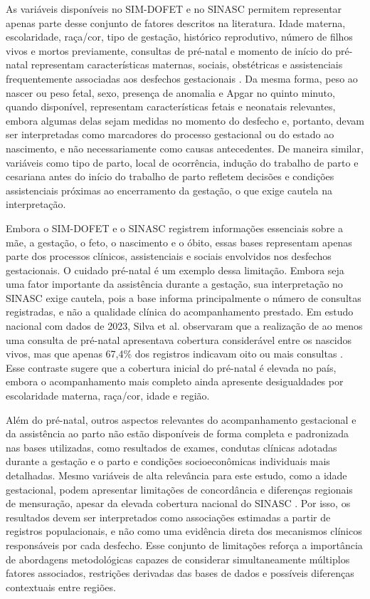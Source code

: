 As variáveis disponíveis no SIM-DOFET e no SINASC permitem representar apenas parte
desse conjunto de fatores descritos na literatura. Idade materna, escolaridade, 
raça/cor, tipo de gestação, histórico reprodutivo, número de filhos vivos 
e mortos previamente, consultas de pré-natal e momento de início do pré-natal 
representam características maternas, sociais, obstétricas e assistenciais frequentemente 
associadas aos desfechos gestacionais \cite{Victor2025PretermBrazil,Marques2026FetRiskS,
ACOG2020Stillbirth,Silva2026PrenatalInequities}. Da mesma forma, peso ao nascer ou 
peso fetal, sexo, presença de anomalia e Apgar no quinto minuto, quando disponível, 
representam características fetais e neonatais relevantes, embora algumas delas 
sejam medidas no momento do desfecho e, portanto, devam ser interpretadas como 
marcadores do processo gestacional ou do estado ao nascimento, e não necessariamente 
como causas antecedentes. De maneira similar, variáveis como tipo de parto, local 
de ocorrência, indução do trabalho de parto e cesariana antes do início do trabalho 
de parto refletem decisões e condições assistenciais próximas ao encerramento da 
gestação, o que exige cautela na interpretação. 

Embora o SIM-DOFET e o SINASC registrem informações essenciais sobre a mãe, a 
gestação, o feto, o nascimento e o óbito, essas bases representam apenas parte 
dos processos clínicos, assistenciais e sociais envolvidos nos desfechos 
gestacionais. O cuidado pré-natal é um exemplo dessa limitação. Embora seja uma 
fator importante da assistência durante a gestação, sua interpretação no 
SINASC exige cautela, pois a base informa principalmente o número de consultas 
registradas, e não a qualidade clínica do acompanhamento prestado. Em estudo 
nacional com dados de 2023, Silva et al. observaram que a realização de ao 
menos uma consulta de pré-natal apresentava cobertura considerável entre os 
nascidos vivos, mas que apenas 67,4\% dos registros indicavam oito ou mais 
consultas \cite{Silva2026PrenatalInequities}. Esse contraste sugere que a 
cobertura inicial do pré-natal é elevada no país, embora o acompanhamento mais 
completo ainda apresente desigualdades por escolaridade materna, raça/cor, 
idade e região.

Além do pré-natal, outros aspectos relevantes do acompanhamento gestacional e da 
assistência ao parto não estão disponíveis de forma completa e padronizada nas 
bases utilizadas, como resultados de exames, condutas clínicas adotadas durante 
a gestação e o parto e condições socioeconômicas individuais mais detalhadas. 
Mesmo variáveis de alta relevância para este estudo, como a idade 
gestacional, podem apresentar limitações de concordância e diferenças regionais 
de mensuração, apesar da elevada cobertura nacional do SINASC 
\cite{Szwarcwald2019SINASC}. Por isso, os resultados devem ser interpretados 
como associações estimadas a partir de registros populacionais, e não como uma 
evidência direta dos mecanismos clínicos responsáveis por cada desfecho. Esse 
conjunto de limitações reforça a importância de abordagens metodológicas capazes 
de considerar simultaneamente múltiplos fatores associados, restrições derivadas 
das bases de dados e possíveis diferenças contextuais entre regiões.

